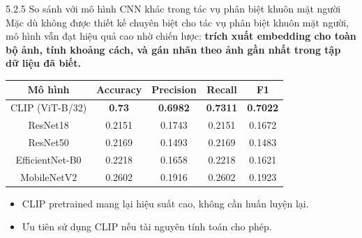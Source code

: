 \begin{frame}{5.2.5 So sánh với mô hình CNN khác trong tác vụ phân biệt khuôn mặt người}
\footnotesize
Mặc dù không được thiết kế chuyên biệt cho tác vụ phân biệt khuôn mặt người, mô hình vẫn đạt hiệu quả cao nhờ chiến lược: \textbf{trích xuất embedding cho toàn bộ ảnh, tính khoảng cách, và gán nhãn theo ảnh gần nhất trong tập dữ liệu đã biết.}
\begin{table}[H]
\centering
\begin{tabular}{|c|c|c|c|c|}
\hline
\textbf{Mô hình} & Accuracy & Precision & Recall & F1 \\
\hline
CLIP (ViT-B/32) & \textbf{0.73} & \textbf{0.6982} & \textbf{0.7311} & \textbf{0.7022} \\
ResNet18        & 0.2151           & 0.1743           & 0.2151          & 0.1672          \\
ResNet50        & 0.2169           & 0.1493         & 0.2169          & 0.1483          \\
EfficientNet-B0 & 0.2218           & 0.1658           & 0.2218          & 0.1621          \\
MobileNetV2     & 0.2602           & 0.1916          & 0.2602         & 0.1923         \\
\hline
\end{tabular}
\end{table}
\begin{itemize}
    \item CLIP pretrained mang lại hiệu suất cao, không cần huấn luyện lại.
    \item Ưu tiên sử dụng CLIP nếu tài nguyên tính toán cho phép.
\end{itemize}
\end{frame}

